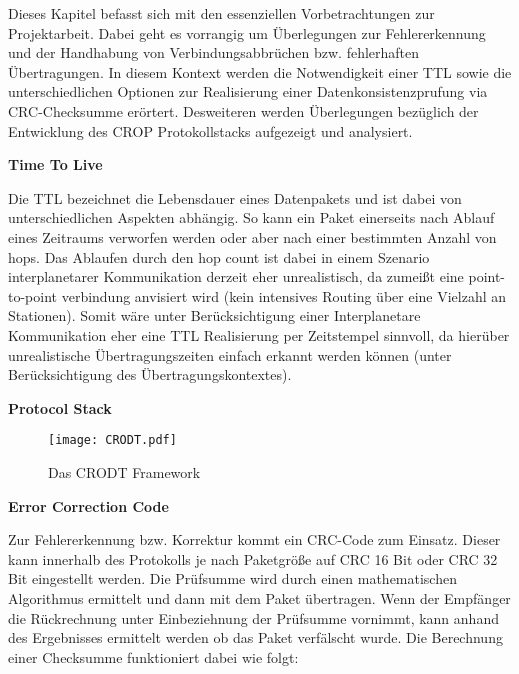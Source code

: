 

Dieses Kapitel befasst sich mit den essenziellen Vorbetrachtungen zur
Projektarbeit. Dabei geht es vorrangig um {\"U}berlegungen zur Fehlererkennung
und der Handhabung von Verbindungsabbr{\"u}chen bzw. fehlerhaften
{\"U}bertragungen. In diesem Kontext werden die Notwendigkeit einer TTL sowie
die unterschiedlichen Optionen zur Realisierung einer Datenkonsistenzpr{u}fung
via CRC-Checksumme er{\"o}rtert. Desweiteren werden {\"U}berlegungen
bez{\"u}glich der Entwicklung des CROP Protokollstacks aufgezeigt und analysiert.

\textbf{Time To Live}

Die TTL bezeichnet die Lebensdauer eines Datenpakets und ist dabei von
unterschiedlichen Aspekten abh{\"a}ngig. So kann ein Paket einerseits nach
Ablauf eines Zeitraums verworfen werden oder aber nach einer bestimmten Anzahl
von hops. Das Ablaufen durch den hop count ist dabei in einem Szenario
interplanetarer Kommunikation derzeit eher unrealistisch, da zumei{\ss}t eine
point-to-point verbindung anvisiert wird (kein intensives Routing {\"u}ber eine
Vielzahl an Stationen). Somit w{\"a}re unter Ber{\"u}cksichtigung einer
Interplanetare Kommunikation eher eine TTL Realisierung per Zeitstempel
sinnvoll, da hier{\"u}ber unrealistische {\"U}bertragungszeiten einfach erkannt
werden k{\"o}nnen (unter Ber{\"u}cksichtigung des {\"U}bertragungskontextes).

\textbf{Protocol Stack}

\begin{figure}[H]
\centering
\texttt{[image: CRODT.pdf]}
\caption{Das CRODT Framework}
\label{fig:CRODT}
\end{figure}

\textbf{Error Correction Code}

Zur Fehlererkennung bzw. Korrektur kommt ein CRC-Code zum Einsatz. Dieser kann
innerhalb des Protokolls je nach Paketgr{\"o}{\ss}e auf CRC 16 Bit oder CRC 32
Bit eingestellt werden. Die Pr{\"u}fsumme wird durch einen mathematischen
Algorithmus ermittelt und dann mit dem Paket {\"u}bertragen. Wenn der
Empf{\"a}nger die R{\"u}ckrechnung unter Einbeziehnung der Pr{\"u}fsumme
vornimmt, kann anhand des Ergebnisses ermittelt werden ob das Paket
verf{\"a}lscht wurde. Die Berechnung einer Checksumme funktioniert dabei wie
folgt:


